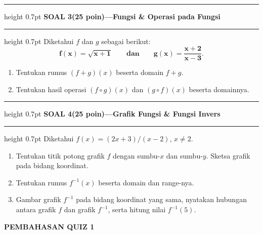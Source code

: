 \documentclass[11pt,a4paper]{article}
\newcommand{\judulsoal}[2]{%
  \par\addvspace{9pt}\hrule height 0.7pt
  \vspace{3pt}\textbf{SOAL #1\quad(25 poin)\quad---\quad #2}\par
  \vspace{2pt}\hrule height 0.7pt\vspace{4pt}}
\begin{document}
\judulsoal{3}{Fungsi \& Operasi pada Fungsi}
Diketahui $f$ dan $g$ sebagai berikut:
\[
  \boldsymbol{f(x)=\sqrt{x+1}}
  \qquad\textbf{dan}\qquad
  \boldsymbol{g(x)=\frac{x+2}{x-3}}.
\]
\begin{enumerate}
  \item Tentukan rumus $(f+g)(x)$ beserta domain $f+g$.
  \item Tentukan hasil operasi $(f\circ g)(x)$ dan $(g\circ f)(x)$ beserta domainnya.
\end{enumerate}

\judulsoal{4}{Grafik Fungsi \& Fungsi Invers}
Diketahui $f(x)=(2x+3)/(x-2)$, $x\ne2$.
\begin{enumerate}
  \item Tentukan titik potong grafik $f$ dengan sumbu-$x$ dan sumbu-$y$.
        Sketsa grafik pada bidang koordinat.
  \item Tentukan rumus $f^{-1}(x)$ beserta domain dan range-nya.
  \item Gambar grafik $f^{-1}$ pada bidang koordinat yang sama,
        nyatakan hubungan antara grafik $f$ dan grafik $f^{-1}$,
        serta hitung nilai $f^{-1}(5)$.
\end{enumerate}
\endgroup

\newpage
\begin{center}
  \textbf{\Large PEMBAHASAN QUIZ 1}
\end{center}
\end{document}
